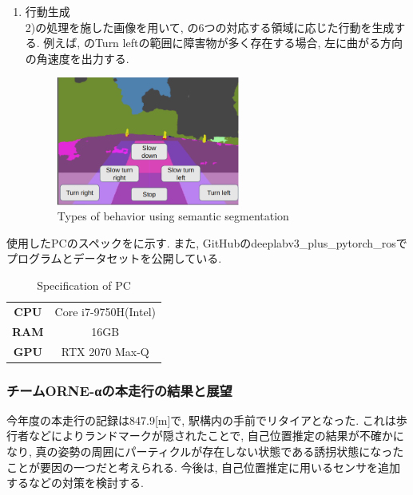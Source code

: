 \documentclass[uplatex, twocolumn, 9pt]{jsproceedings}
\begin{document}
\begin{enumerate}
\begin{figure}[h]
  \end{figure}
  \item 行動生成\\
  2)の処理を施した画像を用いて, の6つの対応する領域に応じた行動を生成する\cite{meiji-thesis}. 例えば, のTurn leftの範囲に障害物が多く存在する場合, 左に曲がる方向の角速度を出力する. 
  \begin{figure}[h]
    \centering
    \includegraphics[width=60mm]{fig/seg.pdf}
    \caption{Types of behavior using semantic segmentation}
    \label{fig:seg}%
  \end{figure}
\end{enumerate}
使用したPCのスペックをに示す. また, GitHubのdeeplabv3\_plus\_pytorch\_ros\cite{DeeplabV3}でプログラムとデータセットを公開している.

\begin{table}
  \centering
  \caption{Specification of PC}
  \label{table:pc}
  \begin{tabular}{cc}
  \toprule%
  \textbf{CPU} & Core i7-9750H(Intel)\\
  \textbf{RAM} & 16GB\\
  \textbf{GPU} & RTX 2070 Max-Q\\
  \bottomrule%
  \end{tabular}
\end{table}


\subsubsection{チームORNE-αの本走行の結果と展望}
今年度の本走行の記録は847.9[m]で, 駅構内の手前でリタイアとなった. これは歩行者などによりランドマークが隠されたことで, 自己位置推定の結果が不確かになり, 真の姿勢の周囲にパーティクルが存在しない状態である誘拐状態\cite{emcl-thesis}になったことが要因の一つだと考えられる. 今後は, 自己位置推定に用いるセンサを追加するなどの対策を検討する. 
\end{document}
